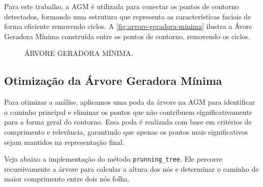 Para este trabalho, a AGM é utilizada para conectar os pontos de contorno detectados, formando uma estrutura que representa as características faciais de forma eficiente removendo ciclos. A \autoref{fig:arvore-geradora-minima} ilustra a Ávore Geradora Mínima construída entre os pontos de contorno, removendo os ciclos.

\begin{figure}
    \caption{ÁRVORE GERADORA MÍNIMA.}
    \label{fig:arvore-geradora-minima}
    \centering
\end{figure}

\subsection{Otimização da Árvore Geradora Mínima}

Para otimizar a análise, aplicamos uma poda da árvore na AGM para identificar o caminho principal e eliminar os pontos que não contribuem significativamente para a forma geral do contorno. Essa poda é realizada com base em critérios de comprimento e relevância, garantindo que apenas os pontos mais significativos sejam mantidos na representação final.


Veja abaixo a implementação do método \texttt{prunning\_tree}. Ele percorre recursivamente a árvore para calcular a altura dos nós e determinar o caminho de maior comprimento entre dois nós folha.

